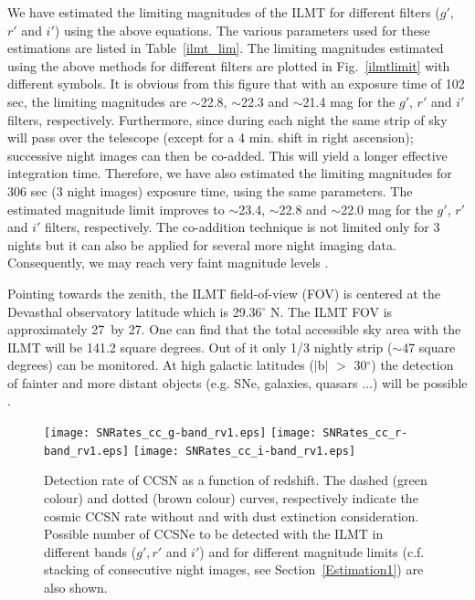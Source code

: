 \documentclass[useAMS,usenatbib]{mnras}
\begin{document}
We have estimated the limiting magnitudes of the ILMT for different filters ($g'$, $r'$ and $i'$) 
using the above equations. The various parameters used for these estimations are listed in 
Table~\ref{ilmt_lim}. The limiting magnitudes estimated using the above methods for different 
filters are plotted in Fig.~\ref{ilmtlimit} with different symbols. It is obvious from this figure 
that with an exposure time of 102 sec, the limiting magnitudes are $\sim$22.8, $\sim$22.3 and 
$\sim$21.4 mag for the $g'$, $r'$ and $i'$ filters, respectively. Furthermore, since during
each night the same strip of sky will pass over the telescope (except for a 4 min. shift in 
right ascension); successive night images can then be co-added. This will yield a 
longer effective integration time. Therefore, we have also estimated the limiting magnitudes 
for 306 sec (3 night images) exposure time, using the same parameters. The estimated magnitude 
limit improves to $\sim$23.4, $\sim$22.8 and $\sim$22.0 mag for the $g'$, $r'$ and $i'$ filters, 
respectively.
The co-addition technique is not limited only for 3 nights but it can also be applied for several
more night imaging data. Consequently, we may reach very faint magnitude levels \citep[see also][]{Borra_1a,
Borra_1b, 2003A&A...404...47B}. 


Pointing towards the zenith, the ILMT field-of-view (FOV) is centered at the Devasthal observatory 
latitude which is 29.36$^\circ$ N. The ILMT FOV is approximately 27\arcmin\ by 27\arcmin. 
One can find that the total accessible sky area with the ILMT will be 141.2 square degrees.
Out of it only 1/3 nightly strip ($\sim$47 square degrees) can be monitored.  
At high galactic latitudes ($\mid$b$\mid$ $>$ 30$^\circ$) the detection of fainter and more distant 
objects (e.g. SNe, galaxies, quasars ...) will be possible \citep[see][]{2006SPIE.6267E...4S,
Magette2010,Finet2013,Kumar2014}.
%
\begin{figure}
\centering
\texttt{[image: SNRates\_cc\_g-band\_rv1.eps]}
\texttt{[image: SNRates\_cc\_r-band\_rv1.eps]}
\texttt{[image: SNRates\_cc\_i-band\_rv1.eps]}
\caption{Detection rate of CCSN as a function of redshift.
The dashed (green colour) and dotted (brown colour) curves, respectively indicate the cosmic CCSN rate
without and with dust extinction consideration. Possible number of CCSNe to be detected with the ILMT
in different bands ($g', r'$ and $i'$) and for different magnitude limits (c.f. stacking of
consecutive night images, see Section~\ref{Estimation1}) are also shown.}
\label{fig_snr_cc}
\end{figure}
\end{document}
